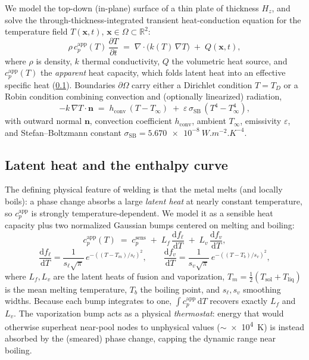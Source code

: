 \documentclass[11pt]{article}
\newcommand{\dd}{\mathrm{d}}
\newcommand{\grad}{\nabla}
\newcommand{\cpapp}{c_p^{\mathrm{app}}}
\newcommand{\cpsens}{c_p^{\mathrm{sens}}}
\newcommand{\Tinf}{T_{\infty}}
\newcommand{\Rset}{\mathbb{R}}
\theoremstyle{definition}
\begin{document}
We model the top-down (in-plane) surface of a thin plate of thickness $H_{\!z}$,
and solve the through-thickness-integrated transient heat-conduction equation for
the temperature field $T(\bm{x},t)$, $\bm{x}\in\Omega\subset\Rset^2$:
\begin{equation}
  \rho\,\cpapp(T)\,\frac{\partial T}{\partial t}
  \;=\;
  \grad\!\cdot\!\big(k(T)\,\grad T\big) \;+\; Q(\bm{x},t),
  \label{eq:heat}
\end{equation}
where $\rho$ is density, $k$ thermal conductivity, $Q$ the volumetric heat source,
and $\cpapp(T)$ the \emph{apparent} heat capacity, which folds latent heat into an
effective specific heat (\cref{sec:latent}). Boundaries $\partial\Omega$ carry either
a Dirichlet condition $T=T_D$ or a Robin condition combining convection and
(optionally linearized) radiation,
\begin{equation}
  -k\,\grad T \cdot \bm{n}
  \;=\;
  h_{\mathrm{conv}}\,(T-\Tinf)
  \;+\; \varepsilon\,\sigma_{\mathrm{SB}}\,(T^4-\Tinf^4),
  \label{eq:robin}
\end{equation}
with outward normal $\bm{n}$, convection coefficient $h_{\mathrm{conv}}$, ambient
$\Tinf$, emissivity $\varepsilon$, and Stefan--Boltzmann constant
$\sigma_{\mathrm{SB}}=\SI{5.670e-8}{W.m^{-2}.K^{-4}}$.

\subsection{Latent heat and the enthalpy curve}
\label{sec:latent}

The defining physical feature of welding is that the metal melts (and locally boils):
a phase change absorbs a large \emph{latent heat} at nearly constant temperature, so
$\cpapp$ is strongly temperature-dependent. We model it as a sensible heat capacity
plus two normalized Gaussian bumps centered on melting and boiling:
\begin{equation}
  \cpapp(T) \;=\; \cpsens
  \;+\; L_f\,\frac{\dd f_\ell}{\dd T}
  \;+\; L_v\,\frac{\dd f_v}{\dd T},
  \label{eq:cpapp}
\end{equation}
\begin{equation}
  \frac{\dd f_\ell}{\dd T}=\frac{1}{s_\ell\sqrt{\pi}}\,
    e^{-\left((T-T_m)/s_\ell\right)^2},
  \qquad
  \frac{\dd f_v}{\dd T}=\frac{1}{s_v\sqrt{\pi}}\,
    e^{-\left((T-T_b)/s_v\right)^2},
  \label{eq:bumps}
\end{equation}
where $L_f, L_v$ are the latent heats of fusion and vaporization,
$T_m=\tfrac12(T_{\mathrm{sol}}+T_{\mathrm{liq}})$ is the mean melting temperature,
$T_b$ the boiling point, and $s_\ell, s_v$ smoothing widths. Because each bump
integrates to one, $\int \cpapp\,\dd T$ recovers exactly $L_f$ and $L_v$. The
vaporization bump acts as a physical \emph{thermostat}: energy that would otherwise
superheat near-pool nodes to unphysical values ($\sim$\SI{e4}{K}) is instead
absorbed by the (smeared) phase change, capping the dynamic range near boiling.
\end{document}
